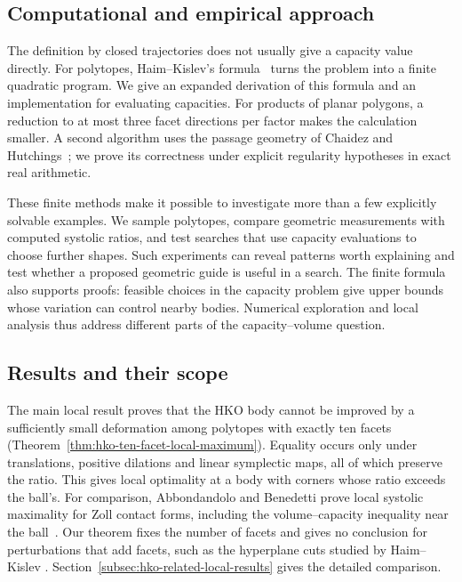 \subsection{Computational and empirical approach}

The definition by closed trajectories does not usually give a capacity
value directly. For polytopes, Haim--Kislev's formula~\cite{HK2017}
turns the problem into a finite quadratic program. We give an expanded
derivation of this formula and an implementation for evaluating capacities.
For products of planar polygons, a reduction to at most three facet
directions per factor makes the calculation smaller. A second algorithm
uses the passage geometry of Chaidez and Hutchings~\cite{CH2021}; we prove
its correctness under explicit regularity hypotheses in exact real
arithmetic.

These finite methods make it possible to investigate more than a few
explicitly solvable examples. We sample polytopes, compare geometric
measurements with computed systolic ratios, and test searches that use
capacity evaluations to choose further shapes. Such experiments can reveal
patterns worth explaining and test whether a proposed geometric guide is
useful in a search. The finite formula also supports proofs: feasible
choices in the capacity problem give upper bounds whose variation can
control nearby bodies. Numerical exploration and local analysis thus
address different parts of the capacity--volume question.

\subsection{Results and their scope}

The main local result proves that the HKO body cannot be improved by a
sufficiently small deformation among polytopes with exactly ten facets
(Theorem~\ref{thm:hko-ten-facet-local-maximum}). Equality occurs only under
translations, positive dilations and linear symplectic maps, all of which
preserve the ratio. This gives local optimality at a body with corners
whose ratio exceeds the ball's. For comparison, Abbondandolo and Benedetti
prove local systolic maximality for Zoll contact forms, including the
volume--capacity inequality near the ball~\cite{AB2023}. Our theorem
fixes the number of facets and gives no conclusion for perturbations that
add facets, such as the hyperplane cuts studied by Haim--Kislev
\cite{HaimKislev2025Zoll}. Section~\ref{subsec:hko-related-local-results}
gives the detailed comparison.

